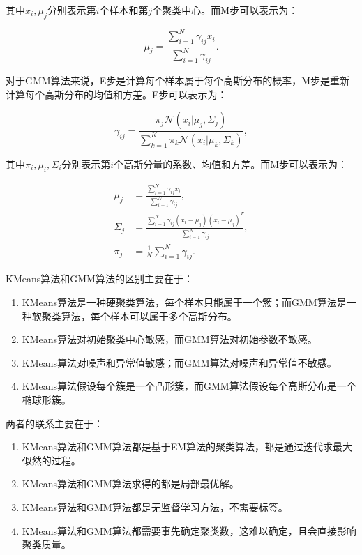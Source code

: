 \documentclass{article}
\begin{document}
其中$x_i,\mu_j$分别表示第$i$个样本和第$j$个聚类中心。而M步可以表示为：

\begin{equation}
    \mu_j = \frac{\sum_{i=1}^{N}\gamma_{ij}x_i}{\sum_{i=1}^{N}\gamma_{ij}}.
\end{equation}

对于GMM算法来说，E步是计算每个样本属于每个高斯分布的概率，M步是重新计算每个高斯分布的均值和方差。E步可以表示为：

\begin{equation}
    \gamma_{ij} = \frac{\pi_j\mathcal{N}(x_i|\mu_j,\Sigma_j)}{\sum_{k=1}^{K}\pi_k\mathcal{N}(x_i|\mu_k,\Sigma_k)},
\end{equation}

其中$\pi_i,\mu_i,\Sigma_i$分别表示第$i$个高斯分量的系数、均值和方差。而M步可以表示为：

\begin{equation}
    \begin{aligned}
        \mu_j &= \frac{\sum_{i=1}^{N}\gamma_{ij}x_i}{\sum_{i=1}^{N}\gamma_{ij}}, \\
        \Sigma_j &= \frac{\sum_{i=1}^{N}\gamma_{ij}(x_i-\mu_j)(x_i-\mu_j)^T}{\sum_{i=1}^{N}\gamma_{ij}}, \\
        \pi_j &= \frac{1}{N}\sum_{i=1}^{N}\gamma_{ij}.
    \end{aligned}
\end{equation}

KMeans算法和GMM算法的区别主要在于：

\begin{enumerate}
    \item KMeans算法是一种硬聚类算法，每个样本只能属于一个簇；而GMM算法是一种软聚类算法，每个样本可以属于多个高斯分布。
    \item KMeans算法对初始聚类中心敏感，而GMM算法对初始参数不敏感。
    \item KMeans算法对噪声和异常值敏感；而GMM算法对噪声和异常值不敏感。
    \item KMeans算法假设每个簇是一个凸形簇，而GMM算法假设每个高斯分布是一个椭球形簇。
\end{enumerate}

两者的联系主要在于：

\begin{enumerate}
    \item KMeans算法和GMM算法都是基于EM算法的聚类算法，都是通过迭代求最大似然的过程。
    \item KMeans算法和GMM算法求得的都是局部最优解。
    \item KMeans算法和GMM算法都是无监督学习方法，不需要标签。
    \item KMeans算法和GMM算法都需要事先确定聚类数，这难以确定，且会直接影响聚类质量。
\end{enumerate}
\end{document}
